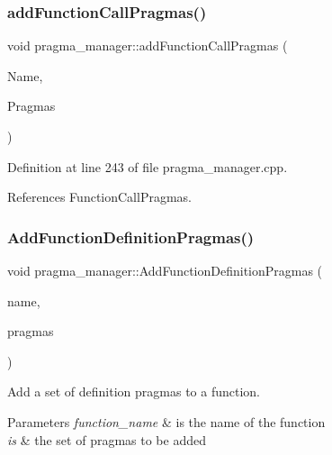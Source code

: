 \subsubsection{\texorpdfstring{add\+Function\+Call\+Pragmas()}{addFunctionCallPragmas()}}
{\footnotesize\ttfamily void pragma\+\_\+manager\+::add\+Function\+Call\+Pragmas (\begin{DoxyParamCaption}\item[{const std\+::string \&}]{Name,  }\item[{const \hyperlink{classCustomUnorderedSet}{Custom\+Unordered\+Set}$<$ std\+::string $>$ \&}]{Pragmas }\end{DoxyParamCaption})}



Definition at line 243 of file pragma\+\_\+manager.\+cpp.



References Function\+Call\+Pragmas.

\mbox{\label{classpragma__manager_a8ae9fe4e390d2823fc713a6a4219edf0}} 
\subsubsection{\texorpdfstring{Add\+Function\+Definition\+Pragmas()}{AddFunctionDefinitionPragmas()}}
{\footnotesize\ttfamily void pragma\+\_\+manager\+::\+Add\+Function\+Definition\+Pragmas (\begin{DoxyParamCaption}\item[{const std\+::string \&}]{name,  }\item[{const \hyperlink{classCustomUnorderedSet}{Custom\+Unordered\+Set}$<$ std\+::string $>$ \&}]{pragmas }\end{DoxyParamCaption})}



Add a set of definition pragmas to a function. 


\begin{DoxyParams}{Parameters}
{\em function\+\_\+name} & is the name of the function \\
\hline
{\em is} & the set of pragmas to be added \\
\hline
\end{DoxyParams}


